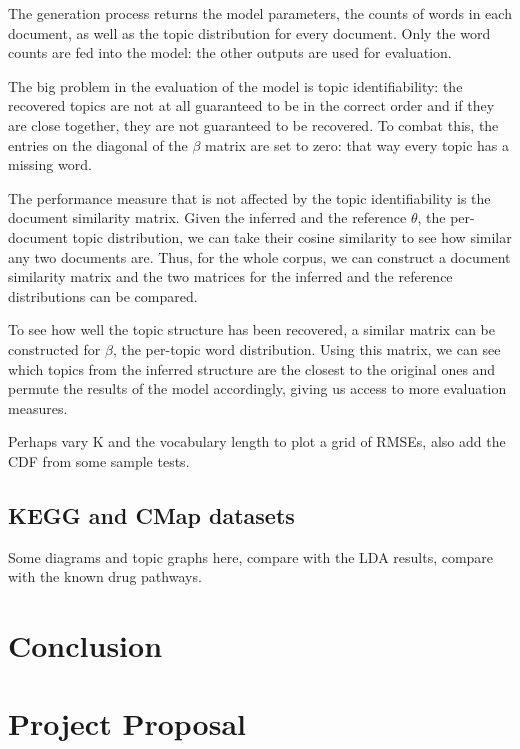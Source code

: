 \documentclass[12pt,a4paper,twoside,openright]{report}
\begin{document}
The generation process returns the model parameters, the counts of words in each document, as well as the topic distribution for every document. Only the word counts are fed into the model: the other outputs are used for evaluation.

The big problem in the evaluation of the model is topic identifiability: the recovered topics are not at all guaranteed to be in the correct order and if they are close together, they are not guaranteed to be recovered. To combat this, the entries on the diagonal of the $\beta$ matrix are set to zero: that way every topic has a missing word.

The performance measure that is not affected by the topic identifiability is the document similarity matrix. Given the inferred and the reference $\theta$, the per-document topic distribution, we can take their cosine similarity to see how similar any two documents are. Thus, for the whole corpus, we can construct a document similarity matrix and the two matrices for the inferred and the reference distributions can be compared.

To see how well the topic structure has been recovered, a similar matrix can be constructed for $\beta$, the per-topic word distribution. Using this matrix, we can see which topics from the inferred structure are the closest to the original ones and permute the results of the model accordingly, giving us access to more evaluation measures.

Perhaps vary K and the vocabulary length to plot a grid of RMSEs, also add the CDF from some sample tests.

\section{KEGG and CMap datasets}

Some diagrams and topic graphs here, compare with the LDA results, compare with the known drug pathways.

\chapter{Conclusion}




\appendix

\chapter{Project Proposal}


\end{document}

